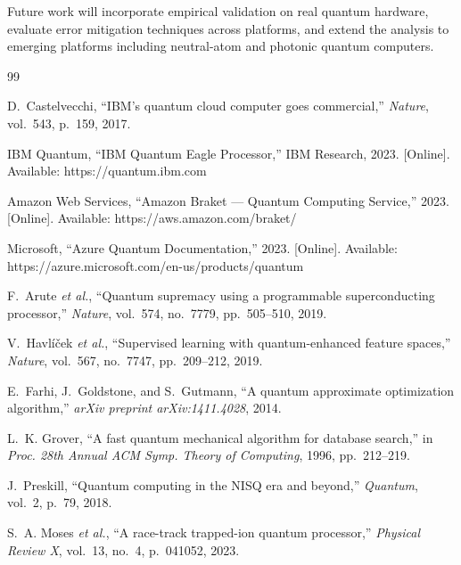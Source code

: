 \documentclass[conference]{IEEEtran}
\begin{document}
Future work will incorporate empirical validation on real quantum hardware, evaluate error mitigation techniques across platforms, and extend the analysis to emerging platforms including neutral-atom and photonic quantum computers.

\begin{thebibliography}{99}

D.~Castelvecchi, ``IBM's quantum cloud computer goes commercial,'' \textit{Nature}, vol.~543, p.~159, 2017.

IBM Quantum, ``IBM Quantum Eagle Processor,'' IBM Research, 2023. [Online]. Available: https://quantum.ibm.com

Amazon Web Services, ``Amazon Braket --- Quantum Computing Service,'' 2023. [Online]. Available: https://aws.amazon.com/braket/

Microsoft, ``Azure Quantum Documentation,'' 2023. [Online]. Available: https://azure.microsoft.com/en-us/products/quantum

F.~Arute \textit{et al.}, ``Quantum supremacy using a programmable superconducting processor,'' \textit{Nature}, vol.~574, no.~7779, pp.~505--510, 2019.

V.~Havl\'{i}\v{c}ek \textit{et al.}, ``Supervised learning with quantum-enhanced feature spaces,'' \textit{Nature}, vol.~567, no.~7747, pp.~209--212, 2019.

E.~Farhi, J.~Goldstone, and S.~Gutmann, ``A quantum approximate optimization algorithm,'' \textit{arXiv preprint arXiv:1411.4028}, 2014.

L.~K. Grover, ``A fast quantum mechanical algorithm for database search,'' in \textit{Proc. 28th Annual ACM Symp. Theory of Computing}, 1996, pp.~212--219.

J.~Preskill, ``Quantum computing in the NISQ era and beyond,'' \textit{Quantum}, vol.~2, p.~79, 2018.

S.~A. Moses \textit{et al.}, ``A race-track trapped-ion quantum processor,'' \textit{Physical Review X}, vol.~13, no.~4, p.~041052, 2023.

\end{thebibliography}
\end{document}
